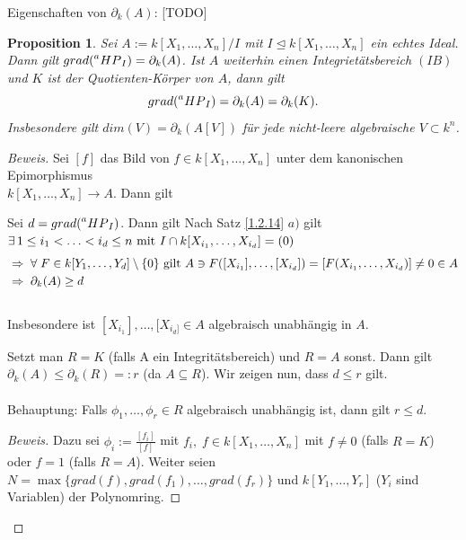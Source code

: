 \documentclass{article}
\newtheorem{proposition}[satz]{Proposition}
\newcommand*{\R}{k[X_{1},\ldots,X_{n}]}
\newcommand*{\indx}[2]{{#1}_{#2}}
\newcommand*{\hp}[1]{$\prescript{a}{}{HP}_{#1}$}
\begin{document}
Eigenschaften von $\indx{\partial}{k}(A)$: [TODO]\\

\begin{proposition}
	Sei $A:=\R/I$ mit $I\unlhd\R$ ein echtes Ideal. Dann gilt $grad(\textnormal{\hp{I}})=\indx{\partial}{k}(A)$. Ist $A$ weiterhin einen Integrietätsbereich $(IB)$ und $K$ ist der Quotienten-Körper von $A$, dann gilt
	\begin{displaymath}
	grad(\textnormal{\hp{I}})=\indx{\partial}{k}(A)=\indx{\partial}{k}(K).
	\end{displaymath}
	Insbesondere gilt $dim(V)=\indx{\partial}{k}(A[V])$ für jede nicht-leere algebraische $V\subset k^n$.\\
\end{proposition}

\begin{proof}[Beweis]
	Sei $[f]$ das Bild von $f\in \R$ unter dem kanonischen Epimorphismus \\$\R\rightarrow A$. Dann gilt
	\begin{compactenum}
		\item Sei $d=grad(\textnormal{\hp{I}})$. Dann gilt Nach Satz \ref{1.2.14} $a)$ gilt $\exists{\,} 1\leq\indx{i}{1}<\ldots<\indx{i}{d}\leq n \textnormal{ mit } I\cap k[\indx{X}{\indx{i}{1}},\ldots,\indx{X}{\indx{i}{d}}]=(0)$
		\begin{align*}
		&\Rightarrow \; \forall \;F\in k[\indx{Y}{1},\ldots,\indx{Y}{d}]\setminus\{0\} \textnormal{ gilt } A\ni F([\indx{X}{\indx{i}{1}}],\ldots,[\indx{X}{\indx{i}{d}}])=[F(\indx{X}{\indx{i}{1}},\ldots,\indx{X}{\indx{i}{d}})]\neq0 \in A\\&
		\Rightarrow \; \indx{\partial}{k}(A)\geq d
		\end{align*}
		\\
		Insbesondere ist $[\indx{X}{\indx{i}{1}}],\ldots,[\indx{X}{\indx{i}{d}]}\in A$ algebraisch unabhängig in $A$.\\
		\item Setzt man $R=K$ (falls A ein Integritätsbereich) und $R=A$ sonst. Dann gilt $\indx{\partial}{k}(A)\leq \indx{\partial}{k}(R)=:r$ (da $A\subseteq R$). Wir zeigen nun, dass $d\leq r$ gilt. 
		\\\\
		Behauptung: Falls $\indx{\phi}{1},\ldots,\indx{\phi}{r}\in R$ algebraisch unabhängig ist, dann gilt $r\leq d$.\\
		\begin{proof}[Beweis]
			Dazu sei $\indx{\phi}{i}:=\frac{[\indx{f}{i}]}{[f]}$ mit $\indx{f}{i},\;f\in \R$ mit $f\neq0$ (falls $R=K$) oder $f=1$ (falls $R=A$). Weiter seien $N=\max{\{grad(f),grad(\indx{f}{1}),\ldots,grad(\indx{f}{r})\}}$ und  $k[\indx{Y}{1},\ldots,\indx{Y}{r}]$ ($\indx{Y}{i}$ sind Variablen) der Polynomring.
			

\end{proof}
\end{compactenum}
\end{proof}
\end{document}
